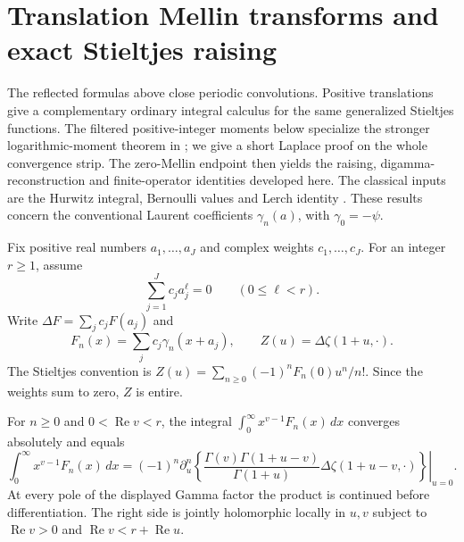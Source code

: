 \section{Translation Mellin transforms and exact Stieltjes raising}
\label{stmell:section}
The reflected formulas above close periodic convolutions. Positive
translations give a complementary ordinary integral calculus for the
same generalized Stieltjes functions. The filtered positive-integer
moments below specialize the stronger logarithmic-moment theorem in
\cite{stmell:balanced}; we give a short Laplace proof on the whole
convergence strip. The zero-Mellin endpoint then yields the raising,
digamma-reconstruction and finite-operator identities developed here.
The classical inputs are the Hurwitz integral, Bernoulli values and
Lerch identity \cite[Eqs.~25.11.25, 25.11.14, 25.11.18]{intdist:DLMFHurwitz}.
These results concern the conventional Laurent coefficients
$\gamma_n(a)$, with $\gamma_0=-\psi$.

Fix positive real numbers $a_1,\ldots,a_J$ and complex weights
$c_1,\ldots,c_J$. For an integer $r\ge1$, assume
\[
 \sum_{j=1}^J c_j a_j^\ell=0\qquad(0\le\ell<r).
\]
Write $\Delta F=\sum_jc_jF(a_j)$ and
\[
 F_n(x)=\sum_jc_j\gamma_n(x+a_j),\qquad
 Z(u)=\Delta\zeta(1+u,\cdot).
\]
The Stieltjes convention is
$Z(u)=\sum_{n\ge0}(-1)^nF_n(0)u^n/n!$.
Since the weights sum to zero, $Z$ is entire.

\begin{theorem}
For $n\ge0$ and $0<\operatorname{Re}v<r$, the integral
$\int_0^\infty x^{v-1}F_n(x)\,dx$ converges absolutely and equals
\begin{equation}\label{stmell:master}
 \int_0^\infty x^{v-1}F_n(x)\,dx
 =(-1)^n\left.\partial_u^n\left\{
 \frac{\Gamma(v)\Gamma(1+u-v)}{\Gamma(1+u)}
 \Delta\zeta(1+u-v,\cdot)\right\}\right|_{u=0}.
\end{equation}
At every pole of the displayed Gamma factor the product is continued
before differentiation. The right side is jointly holomorphic locally
in $u,v$ subject to $\operatorname{Re}v>0$ and
$\operatorname{Re}v<r+\operatorname{Re}u$.
\end{theorem}

